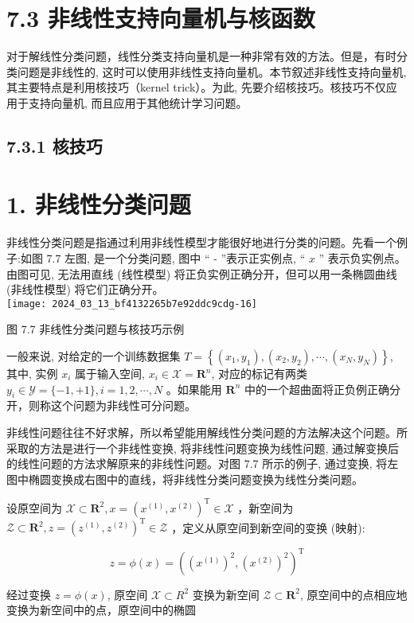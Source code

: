 \documentclass[10pt]{article}
\begin{document}
\section*{7.3 非线性支持向量机与核函数}
对于解线性分类问题，线性分类支持向量机是一种非常有效的方法。但是，有时分类问题是非线性的, 这时可以使用非线性支持向量机。本节叙述非线性支持向量机, 其主要特点是利用核技巧（kernel trick）。为此, 先要介绍核技巧。核技巧不仅应用于支持向量机, 而且应用于其他统计学习问题。

\subsection*{7.3.1 核技巧}
\section*{1. 非线性分类问题}
非线性分类问题是指通过利用非线性模型才能很好地进行分类的问题。先看一个例子:如图 7.7 左图, 是一个分类问题, 图中 “ - ”表示正实例点, “ $x$ ” 表示负实例点。由图可见, 无法用直线 (线性模型) 将正负实例正确分开，但可以用一条椭圆曲线 (非线性模型) 将它们正确分开。\\
\texttt{[image: 2024\_03\_13\_bf4132265b7e92ddc9cdg-16]}

图 7.7 非线性分类问题与核技巧示例

一般来说, 对给定的一个训练数据集 $T=\left\{\left(x_{1}, y_{1}\right),\left(x_{2}, y_{2}\right), \cdots,\left(x_{N}, y_{N}\right)\right\}$, 其中, 实例 $x_{i}$ 属于输入空间, $x_{i} \in \mathcal{X}=\boldsymbol{R}^{n}$, 对应的标记有两类 $y_{i} \in \mathcal{Y}=\{-1,+1\}, i=1,2, \cdots, N$ 。如果能用 $\boldsymbol{R}^{n}$ 中的一个超曲面将正负例正确分开，则称这个问题为非线性可分问题。

非线性问题往往不好求解，所以希望能用解线性分类问题的方法解决这个问题。所采取的方法是进行一个非线性变换, 将非线性问题变换为线性问题, 通过解变换后的线性问题的方法求解原来的非线性问题。对图 7.7 所示的例子, 通过变换, 将左图中椭圆变换成右图中的直线，将非线性分类问题变换为线性分类问题。

设原空间为 $\mathcal{X} \subset \boldsymbol{R}^{2}, x=\left(x^{(1)}, x^{(2)}\right)^{\mathrm{T}} \in \mathcal{X}$ ，新空间为 $\mathcal{Z} \subset \boldsymbol{R}^{2}, z=\left(z^{(1)}, z^{(2)}\right)^{\mathrm{T}} \in \mathcal{Z}$ ，定义从原空间到新空间的变换 (映射):

$$
z=\phi(x)=\left(\left(x^{(1)}\right)^{2},\left(x^{(2)}\right)^{2}\right)^{\mathrm{T}}
$$

经过变换 $z=\phi(x)$, 原空间 $\mathcal{X} \subset R^{2}$ 变换为新空间 $\mathcal{Z} \subset \boldsymbol{R}^{2}$, 原空间中的点相应地变换为新空间中的点，原空间中的椭圆
\end{document}
